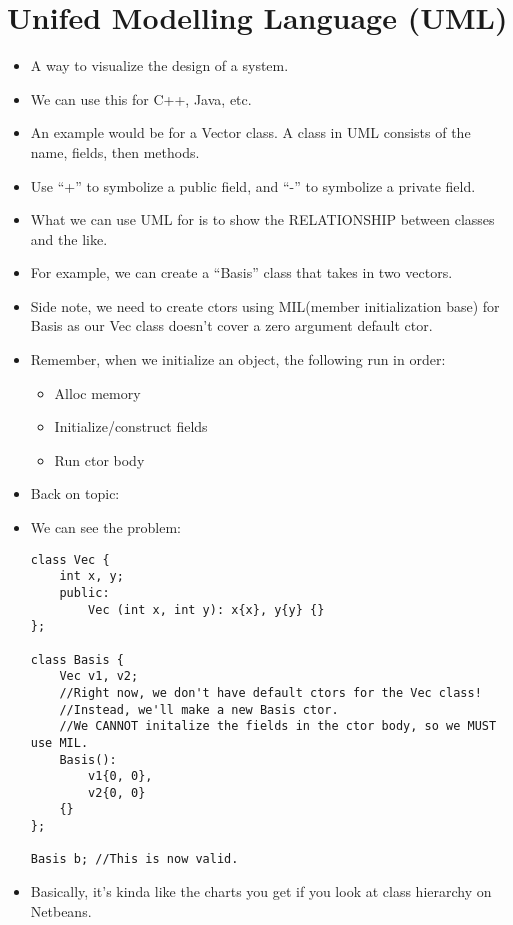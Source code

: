 \documentclass{article}
\begin{document}
\section{Unifed Modelling Language (UML)}
\begin{itemize}
\item A way to visualize the design of a system.
\item We can use this for C++, Java, etc.
\item An example would be for a Vector class.  A class in UML consists of the name, fields, then methods.
\item Use ``+'' to symbolize a public field, and ``-'' to symbolize a private field.
\item What we can use UML for is to show the RELATIONSHIP between classes and the like.
\item For example, we can create a ``Basis'' class that takes in two vectors.
\item Side note, we need to create ctors using MIL(member initialization base) for Basis as our Vec class doesn't cover a zero argument default ctor.
\item Remember, when we initialize an object, the following run in order:
\begin{itemize}
\item Alloc memory
\item Initialize/construct fields
\item Run ctor body
\end{itemize}
\item Back on topic:
\item We can see the problem:
\begin{lstlisting}
class Vec {
    int x, y;
    public:
        Vec (int x, int y): x{x}, y{y} {}
};

class Basis {
    Vec v1, v2;
    //Right now, we don't have default ctors for the Vec class!
    //Instead, we'll make a new Basis ctor.
    //We CANNOT initalize the fields in the ctor body, so we MUST use MIL.
    Basis():
        v1{0, 0},
        v2{0, 0}
    {}
};

Basis b; //This is now valid.
\end{lstlisting}
\item Basically, it's kinda like the charts you get if you look at class hierarchy on Netbeans.
\end{itemize}
\end{document}
